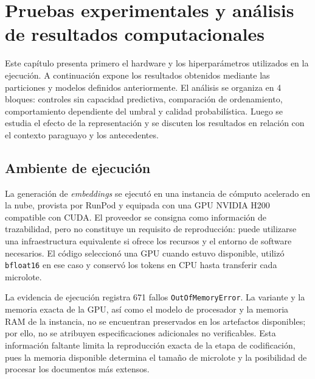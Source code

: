 \clearpage
{}
\chapter{Pruebas experimentales y análisis de resultados computacionales}
\label{sec:resultados}

Este capítulo presenta primero el hardware y los hiperparámetros utilizados en la ejecución. A continuación expone los resultados obtenidos mediante las particiones y modelos definidos anteriormente. El análisis se organiza en 4 bloques: controles sin capacidad predictiva, comparación de ordenamiento, comportamiento dependiente del umbral y calidad probabilística. Luego se estudia el efecto de la representación y se discuten los resultados en relación con el contexto paraguayo y los antecedentes.

\section{Ambiente de ejecución}

La generación de \textit{embeddings} se ejecutó en una instancia de cómputo acelerado en la nube, provista por RunPod y equipada con una GPU NVIDIA H200 compatible con CUDA. El proveedor se consigna como información de trazabilidad, pero no constituye un requisito de reproducción: puede utilizarse una infraestructura equivalente si ofrece los recursos y el entorno de software necesarios. El código seleccionó una GPU cuando estuvo disponible, utilizó \texttt{bfloat16} en ese caso y conservó los tokens en CPU hasta transferir cada microlote.

La evidencia de ejecución registra 671 fallos \texttt{OutOfMemoryError}. La variante y la memoria exacta de la GPU, así como el modelo de procesador y la memoria RAM de la instancia, no se encuentran preservados en los artefactos disponibles; por ello, no se atribuyen especificaciones adicionales no verificables. Esta información faltante limita la reproducción exacta de la etapa de codificación, pues la memoria disponible determina el tamaño de microlote y la posibilidad de procesar los documentos más extensos.

